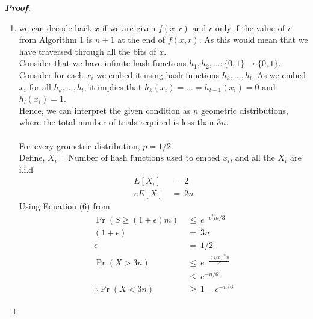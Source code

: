 \documentclass{article}
\begin{document}
\begin{proof}[\textbf{Proof}]
    \begin{enumerate}
        \item we can decode back $x$ if we are given $f(x,r)$ and $r$ only if 
        the value of $i$ from Algorithm 1 is $n+1$ at the end of $f(x,r)$. As
        this would mean that we have traversed through all the bits of $x$.\\
        Consider that we have infinite hash functions 
        $h_1,h_2,...:\{0,1\}\rightarrow\{0,1\}$.\\
        Consider for each $x_i$ we embed it using hash functions $h_k,...,h_l$.
        As we embed $x_i$ for all $h_k,...,h_l$, it implies that 
        $h_k(x_i)=...=h_{l-1}(x_i)=0$ and $h_l(x_i)=1$.\\
        Hence, we can interpret the given condition as $n$ geometric distributions,
        where the total number of trials required is less than $3n$.\\
        \\
        For every grometric distribution, $p=1/2$.\\
        Define, $X_i = \text{Number of hash functions used to embed }x_i$, and
        all the $X_i$ are i.i.d\\
        \begin{align}
            E[X_i] &~=~ 2 \nonumber \\
            \therefore E[X] &~=~ 2n \nonumber        
        \end{align}
        Using Equation (6) from \cite{HR90}
        \begin{align}
            \Pr(S\geq(1+\epsilon)m) &~\leq ~e^{-\epsilon^2m/3} \nonumber\\
            (1+\epsilon)&~=~3n \nonumber\\
            \epsilon&~=~1/2 \nonumber\\
            \Pr(X>3n)&~\leq ~e^{-\frac{(1/2)^22n}{3}} \nonumber\\
            &~\leq ~e^{-n/6} \nonumber \\
            \therefore \Pr(X<3n) &~\geq ~1-e^{-n/6} \nonumber
        \end{align}
        

\end{enumerate}
\end{proof}
\end{document}

